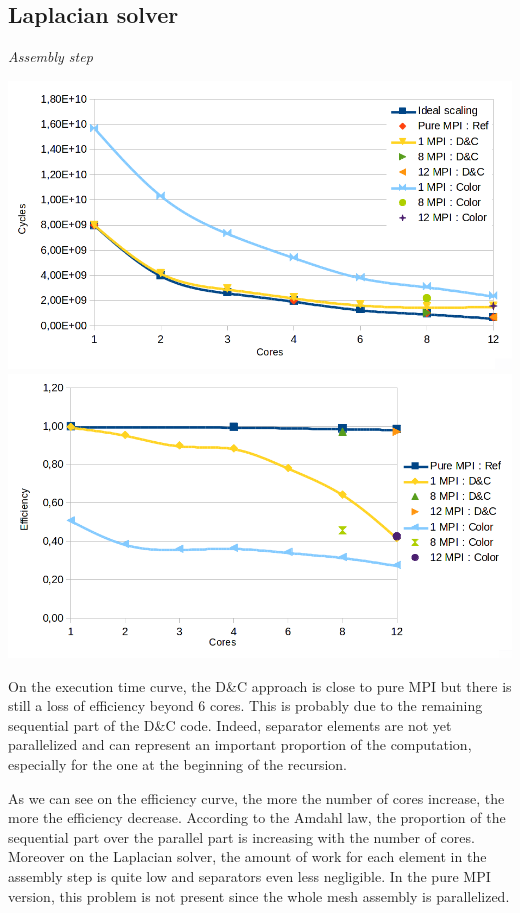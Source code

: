 \documentclass{IOS-Book-Article}
\begin{document}
\subsection{Laplacian solver}
\emph{Assembly step}
\begin{center}
 \includegraphics[scale=0.2]{Laplacian_asm_time.png}
 \includegraphics[scale=0.2]{Laplacian_asm_efficiency.png}
\end{center}
On the execution time curve, the D\&C approach is close to pure MPI but there is still a loss of efficiency beyond 6 cores.
This is probably due to the remaining sequential part of the D\&C code. Indeed, separator elements are not yet parallelized and can represent an important proportion
of the computation, especially for the one at the beginning of the recursion.

As we can see on the efficiency curve, the more the number of cores increase, the more the efficiency decrease. According to the Amdahl law,
the proportion of the sequential part over the parallel part is increasing with the number of cores. Moreover on the Laplacian solver, the amount of work for each
element in the assembly step is quite low and separators even less negligible. In the pure MPI version, this problem is not present since the whole mesh assembly is parallelized.
\end{document}
